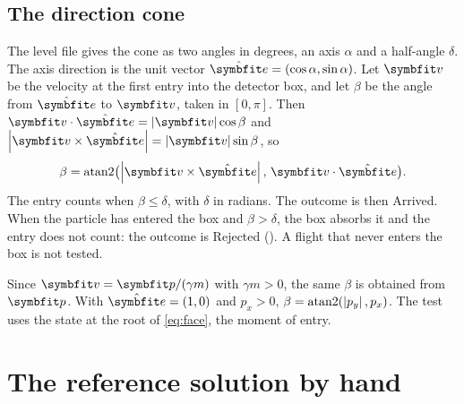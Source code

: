 \documentclass{leveldoc}
\begin{document}
\subsection{The direction cone}\label{sec:cone}

The level file gives the cone as two angles in degrees, an axis $\alpha$ and a half-angle
$\delta$. The axis direction is the unit vector
$\uvec{e} = (\cos\alpha, \sin\alpha)$. Let $\vect{v}$ be the velocity at the first entry
into the detector box, and let $\beta$ be the angle from $\uvec{e}$ to $\vect{v}$, taken
in $[0, \pi]$. Then $\vect{v}\cdot\uvec{e} = \abs{\vect{v}}\cos\beta$ and
$\abs{\vect{v}\times\uvec{e}} = \abs{\vect{v}}\sin\beta$, so
\begin{equation}\label{eq:cone}
  \beta = \operatorname{atan2}\bigl(\abs{\vect{v}\times\uvec{e}},\, \vect{v}\cdot\uvec{e}\bigr).
\end{equation}
The entry counts when $\beta \le \delta$, with $\delta$ in radians. The outcome is then
Arrived. When the particle has entered the box and $\beta > \delta$, the box absorbs it
and the entry does not count: the outcome is Rejected (). A flight that
never enters the box is not tested.

Since $\vect{v} = \vect{p}/(\gamma m)$ with $\gamma m > 0$, the same $\beta$ is obtained
from $\vect{p}$. With $\uvec{e} = (1, 0)$ and $p_x > 0$,
$\beta = \operatorname{atan2}(\left\lvert p_y\right\rvert, p_x)$. The test uses the state at the root of
\eqref{eq:face}, the moment of entry.

\section{The reference solution by hand}\label{sec:hand}
\end{document}

